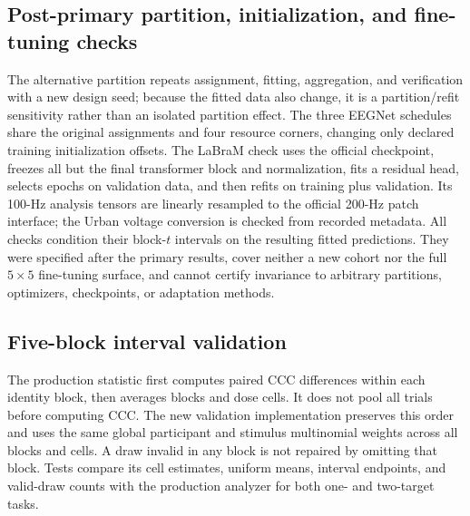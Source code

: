 \subsection{Post-primary partition, initialization, and fine-tuning checks}

The alternative partition repeats assignment, fitting, aggregation, and
verification with a new design seed; because the fitted data also change, it is
a partition/refit sensitivity rather than an isolated partition effect. The
three EEGNet schedules share the original assignments and four resource
corners, changing only declared training initialization offsets. The LaBraM
check uses the official checkpoint, freezes all but the final transformer block
and normalization, fits a residual head, selects epochs on validation data, and
then refits on training plus validation. Its 100-Hz analysis tensors are
linearly resampled to the official 200-Hz patch interface; the Urban voltage
conversion is checked from recorded metadata. All checks condition their
block-$t$ intervals on the resulting fitted predictions. They were specified
after the primary results, cover neither a new cohort nor the full $5\times5$
fine-tuning surface, and cannot certify invariance to arbitrary partitions,
optimizers, checkpoints, or adaptation methods.

\subsection{Five-block interval validation}
The production statistic first computes paired CCC differences within each
identity block, then averages blocks and dose cells. It does not pool all
trials before computing CCC. The new validation implementation preserves this
order and uses the same global participant and stimulus multinomial weights
across all blocks and cells. A draw invalid in any block is not repaired by
omitting that block. Tests compare its cell estimates, uniform means, interval
endpoints, and valid-draw counts with the production analyzer for both one-
and two-target tasks.

